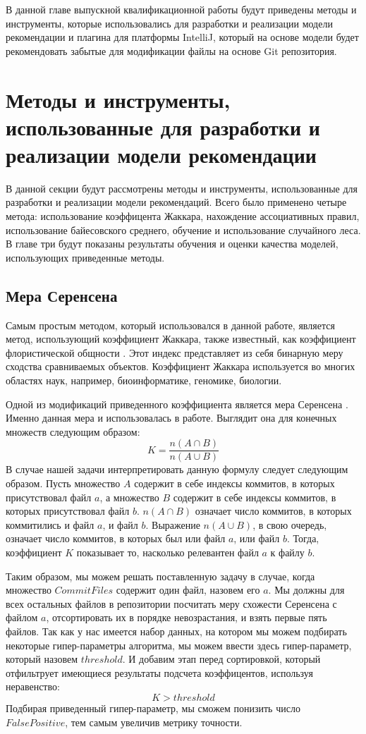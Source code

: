 В данной главе выпускной квалификационной работы будут приведены методы и инструменты, которые использовались для разработки и реализации модели рекомендации и плагина для платформы IntelliJ, который на основе модели будет рекомендовать забытые для модификации файлы на основе Git репозитория.

\section{Методы и инструменты, использованные для разработки и реализации модели рекомендации}
В данной секции будут рассмотрены методы и инструменты, использованные для разработки и реализации модели рекомендаций. Всего было применено четыре метода: использование коэффицента Жаккара, нахождение ассоциативных правил, использование байесовского среднего, обучение и использование случайного леса. В главе три будут показаны результаты обучения и оценки качества моделей, использующих приведенные методы.
    \subsection{Мера Серенсена}\label{chapter-2-coef}
Самым простым методом, который использовался в данной работе, является метод, использующий коэффициент Жаккара, также известный, как коэффициент флористической общности \cite{jacard}. Этот индекс представляет из себя бинарную меру сходства сравниваемых объектов. Коэффициент Жаккара используется во многих областях наук, например, биоинформатике, геномике, биологии. 

Одной из модификаций приведенного коэффициента является мера Серенсена \cite{jacard2}. Именно данная мера и использовалась в работе. Выглядит она для конечных множеств следующим образом:
    $$K = \frac{n(A \cap B)}{n(A \cup B)}$$
В случае нашей задачи интерпретировать данную формулу следует следующим образом. Пусть множество $A$ содержит в себе индексы коммитов, в которых присутствовал файл $a$, а множество $B$ содержит в себе индексы коммитов, в которых присутствовал файл $b$. $n(A \cap B)$ означает число коммитов, в которых коммитились и файл $a$, и файл $b$. Выражение $n(A \cup B)$, в свою очередь, означает число коммитов, в которых был или файл $a$, или файл $b$. Тогда, коэффициент $K$ показывает то, насколько релевантен файл $a$ к файлу $b$. 

Таким образом, мы можем решать поставленную задачу в случае, когда множество $CommitFiles$ содержит один файл, назовем его $a$. Мы должны для всех остальных файлов в репозитории посчитать меру схожести Серенсена с файлом $a$, отсортировать их в порядке невозрастания, и взять первые пять файлов. Так как у нас имеется набор данных, на котором мы можем подбирать некоторые гипер-параметры алгоритма, мы можем ввести здесь гипер-параметр, который назовем $threshold$. И добавим этап перед сортировкой, который отфильтрует имеющиеся результаты подсчета коэффицентов, используя неравенство: 
    $$K > threshold$$
Подбирая приведенный гипер-параметр, мы сможем понизить число $FalsePositive$, тем самым увеличив метрику точности.

